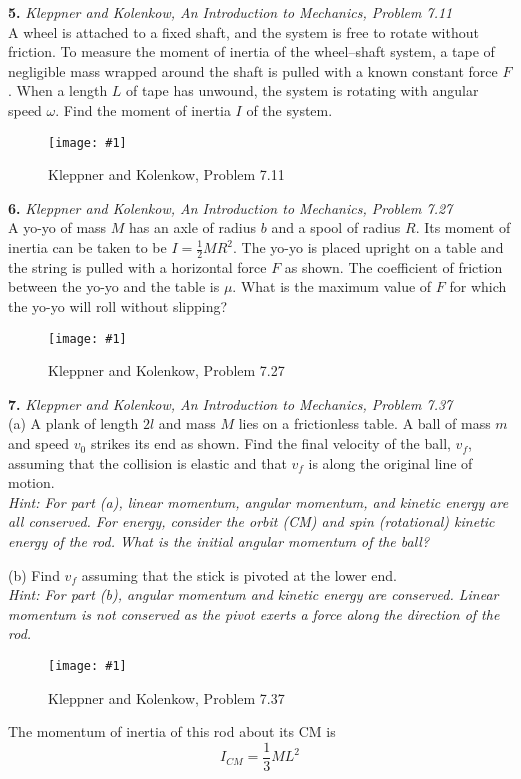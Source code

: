 \documentclass[11pt]{article}
\newcommand{\fig}[4]{
    \begin{figure}[H]
        \centering
        \texttt{[image: \#1]}
        \caption{#2}
        \label{exp4fit}
    \end{figure}
}
\theoremstyle{gangnamstyle}{\newtheorem{definition}{Definition}[]}
\theoremstyle{gangnamstyle}{\newtheorem{example}{Example}[]}
\theoremstyle{gangnamstyle}{\newtheorem{problem}{Problem}[]}
\begin{document}
\pagebreak

\textbf{5.} \textit{Kleppner and Kolenkow, An Introduction to Mechanics, Problem 7.11} \\
A wheel is attached to a fixed shaft, and the system is free to rotate without friction. To measure the moment of inertia of the wheel–shaft system, a tape of negligible mass wrapped around the shaft is pulled with a known constant force $F$. When a length $L$ of tape has unwound, the system is rotating with angular speed $\omega$. Find the moment of inertia $I$ of the system.
\fig{figs/0718/kk711.png}{Kleppner and Kolenkow, Problem 7.11}{0.5}{0}

\pagebreak

\textbf{6.} \textit{Kleppner and Kolenkow, An Introduction to Mechanics, Problem 7.27} \\
A yo-yo of mass $M$ has an axle of radius $b$ and a spool of radius $R$. Its moment of inertia can be taken to be $I = \frac{1}{2}MR^2$. The yo-yo is placed upright on a table and the string is pulled with a horizontal force $F$ as shown. The coefficient of friction between the yo-yo and the table is $\mu$. What is the maximum value of $F$ for which the yo-yo will roll without slipping?
\fig{figs/0718/kk727.png}{Kleppner and Kolenkow, Problem 7.27}{0.5}{0}


\pagebreak

\textbf{7.} \textit{Kleppner and Kolenkow, An Introduction to Mechanics, Problem 7.37} \\
(a) A plank of length $2l$ and mass $M$ lies on a frictionless table. A ball of mass $m$ and speed $v_0$ strikes its end as shown. Find the final velocity of the ball, $v_f$, assuming that the collision is elastic and that $v_f$ is along the original line of motion. \\
\textit{Hint: For part (a), linear momentum, angular momentum, and kinetic energy are all conserved. For energy, consider the orbit (CM) and spin (rotational) kinetic energy of the rod. What is the initial angular momentum of the ball? }

(b) Find $v_f$ assuming that the stick is pivoted at the lower end. \\
\textit{Hint: For part (b), angular momentum and kinetic energy are conserved. Linear momentum is not conserved as the pivot exerts a force along the direction of the rod. }
\fig{figs/0718/kk737.png}{Kleppner and Kolenkow, Problem 7.37}{0.5}{0}
The momentum of inertia of this rod about its CM is
\[ I_{CM} = \frac{1}{3}ML^2 \]
\end{document}

